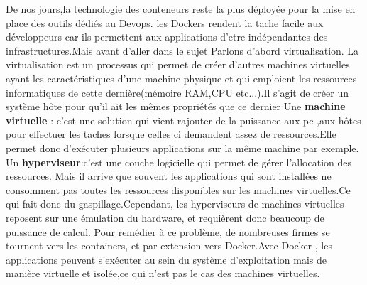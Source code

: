 De nos jours,la technologie des conteneurs reste la plus déployée pour la mise en place des outils dédiés au Devops. les Dockers rendent  la tache facile aux développeurs car ils permettent aux applications d'etre indépendantes des infrastructures.Mais avant d'aller dans le sujet 
Parlons d’abord virtualisation.
La virtualisation est un processus qui permet de créer d'autres machines virtuelles ayant les caractéristiques d'une machine physique et qui emploient les ressources informatiques de cette dernière(mémoire RAM,CPU etc...).Il s’agit de créer un système hôte pour qu’il ait les mêmes propriétés que ce dernier
Une \textbf{machine virtuelle} : c’est une solution qui vient rajouter de la puissance aux pc ,aux hôtes pour effectuer les taches lorsque celles ci demandent assez de ressources.Elle permet donc d'exécuter plusieurs applications sur la même machine par exemple.
Un \textbf{hyperviseur}:c'est une couche logicielle qui permet de gérer l'allocation des ressources.
Mais il arrive que souvent les applications qui sont installées  ne consomment pas toutes les ressources disponibles sur les machines virtuelles.Ce qui fait donc du gaspillage.Cependant, les hyperviseurs de machines virtuelles reposent sur une émulation du hardware, et requièrent donc beaucoup de puissance de calcul. Pour remédier à ce problème, de nombreuses firmes se tournent vers les containers, et par extension vers Docker.Avec Docker , les applications peuvent s'exécuter au sein du système d'exploitation mais de manière virtuelle et isolée,ce qui n'est pas le cas des machines virtuelles.
